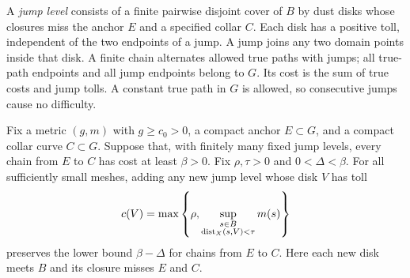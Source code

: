 A \emph{jump level} consists of a finite pairwise disjoint cover of
$B$ by dust disks whose closures miss the anchor $E$ and a specified
collar $C$.  Each disk has a positive toll, independent of the two
endpoints of a jump.  A jump joins any two domain points inside that
disk.  A finite chain alternates allowed true paths with jumps; all
true-path endpoints and all jump endpoints belong to $G$.
Its cost is the sum of true costs and jump tolls.  A constant true
path in $G$ is allowed, so consecutive jumps cause no difficulty.

\begin{lemma}
\label{lem:jump-removal}
Fix a metric $(g,m)$ with $g\ge c_0>0$, a compact anchor $E\subset G$, and
a compact collar curve $C\subset G$.  Suppose that, with finitely
many fixed jump levels, every chain from $E$ to $C$ has cost at least
$\beta>0$.  Fix $\rho,\tau>0$ and $0<\Delta<\beta$.
For all sufficiently small meshes, adding any new jump level whose
disk $V$ has toll
\begin{equation}\label{eq:neighborhood-jump-cost}
 c(V)=\max\left\{\rho,
       \sup_{\substack{s\in B\\\operatorname{dist}_X(s,V)<\tau}}m(s)\right\}
\end{equation}
preserves the lower bound $\beta-\Delta$ for chains from $E$ to $C$.
Here each new disk meets $B$ and its closure misses $E$ and $C$.
\end{lemma}

